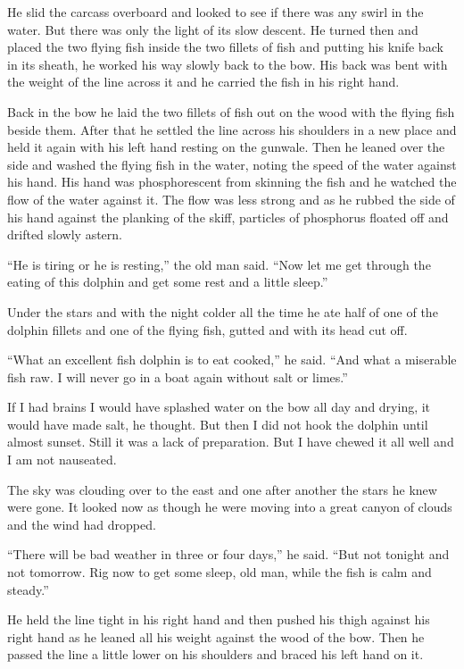 \documentclass[fontset=ubuntu,zihao=-4]{ctexrep}
\newlength{\drop}%
\begin{document}
He slid the carcass overboard and looked to see if there was any swirl in
the water. But there was only the light of its slow \gls{descent}. He turned
then and placed the two flying fish inside the two \glspl{fillet} of fish
and putting his knife back in its sheath, he worked his way slowly back to
the bow. His back was \gls{bent} with the weight of the line across it and
he carried the fish in his right hand.

Back in the bow he laid the two fillets of fish out on the wood with the
flying fish beside them. After that he settled the line across his shoulders
in a new place and held it again with his left hand resting on the gunwale.
Then he leaned over the side and washed the flying fish in the water,
\gls{noting} the speed of the water against his hand. His hand was
phosphorescent from skinning the fish and he watched the flow of the water
against it. The flow was less strong and as he rubbed the side of his hand
against the planking of the skiff, \glspl{particle} of \gls{phosphorus}
floated off and drifted slowly \gls{astern}.

``He is tiring or he is resting,'' the old man said. ``Now let me get
through the eating of this dolphin and get some rest and a little sleep.''

Under the stars and with the night colder all the time he ate half of one
of the dolphin fillets and one of the flying fish, gutted and with its head
cut off.

``What an excellent fish dolphin is to eat cooked,'' he said. ``And what a
\gls{miserable} fish raw. I will never go in a boat again without salt or
limes.''

If I had brains I would have \gls{splashed} water on the bow all day and
drying, it would have made salt, he thought. But then I did not hook the
dolphin until almost sunset. Still it was a lack of \gls{preparation}. But I
have chewed it all well and I am not \gls{nauseated}.

The sky was clouding over to the east and one after another the stars he
knew were gone. It looked now as though he were moving into a great
\gls{canyon} of clouds and the wind had dropped.

``There will be bad weather in three or four days,'' he said. ``But not
tonight and not tomorrow. Rig now to get some sleep, old man, while the fish
is calm and steady.''

He held the line tight in his right hand and then pushed his thigh against
his right hand as he leaned all his weight against the wood of the bow. Then
he passed the line a little lower on his shoulders and braced his left hand
on it.
\end{document}
